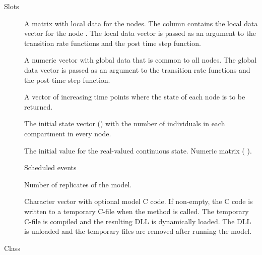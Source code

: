\documentclass[letterpaper]{book}
\begin{document}
\begin{Section}{Slots}
\begin{description}
\item[] A matrix with local data for the nodes. The column
 contains the local data vector for the node
. The local data vector is passed as an argument to
the transition rate functions and the post time step function.

\item[] A numeric vector with global data that is common to
all nodes.  The global data vector is passed as an argument to
the transition rate functions and the post time step function.

\item[] A vector of increasing time points where the state of
each node is to be returned.

\item[] The initial state vector () with the
number of individuals in each compartment in every node.

\item[] The initial value for the real-valued continuous state.
Numeric matrix ( ).

\item[] Scheduled events 

\item[] Number of replicates of the model.

\item[] Character vector with optional model C code. If
non-empty, the C code is written to a temporary C-file when
the  method is called.  The temporary C-file is
compiled and the resulting DLL is dynamically loaded. The DLL
is unloaded and the temporary files are removed after running
the model.

\end{description}
\end{Section}
%
\begin{Description}
Class 
\end{Description}
%
\end{document}
